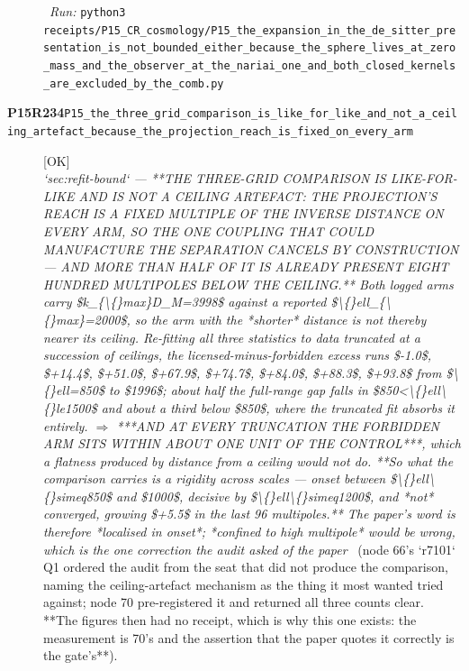 \begin{description}
\ \emph{Run:} \texttt{python3 receipts/P15\_CR\_cosmology/P15\_the\_expansion\_in\_the\_de\_sitter\_presentation\_is\_not\_bounded\_either\_because\_the\_sphere\_lives\_at\_zero\_mass\_and\_the\_observer\_at\_the\_nariai\_one\_and\_both\_closed\_kernels\_are\_excluded\_by\_the\_comb.py}
\item[\rcptlabel{P15_the_three_grid_comparison_is_like_for_like_and_not_a_ceiling_artefact_because_the_projection_reach_is_fixed_on_every_arm}{P15R234}\textbf{P15R234}\quad\texttt{P15\_the\_three\_grid\_comparison\_is\_like\_for\_like\_and\_not\_a\_ceiling\_artefact\_because\_the\_projection\_reach\_is\_fixed\_on\_every\_arm}]\hfill\textsf{[OK]}\\
\textit{`sec:refit-bound` ---  **THE THREE-GRID COMPARISON IS LIKE-FOR-LIKE AND IS NOT A CEILING ARTEFACT: THE PROJECTION'S REACH IS A FIXED MULTIPLE OF THE INVERSE DISTANCE ON EVERY ARM, SO THE ONE COUPLING THAT COULD MANUFACTURE THE SEPARATION CANCELS BY CONSTRUCTION --- AND MORE THAN HALF OF IT IS ALREADY PRESENT EIGHT HUNDRED MULTIPOLES BELOW THE CEILING.** Both logged arms carry \$k\_\{\textbackslash\{\}max\}D\_M=3998\$ against a reported \$\textbackslash\{\}ell\_\{\textbackslash\{\}max\}=2000\$, so the arm with the *shorter* distance is not thereby nearer its ceiling. Re-fitting all three statistics to data truncated at a succession of ceilings, the licensed-minus-forbidden excess runs \$-1.0\$, \$+14.4\$, \$+51.0\$, \$+67.9\$, \$+74.7\$, \$+84.0\$, \$+88.3\$, \$+93.8\$ from \$\textbackslash\{\}ell=850\$ to \$1996\$; about half the full-range gap falls in \$850<\textbackslash\{\}ell\textbackslash\{\}le1500\$ and about a third below \$850\$, where the truncated fit absorbs it entirely. \ensuremath{\Rightarrow} ***AND AT EVERY TRUNCATION THE FORBIDDEN ARM SITS WITHIN ABOUT ONE UNIT OF THE CONTROL***, which a flatness produced by distance from a ceiling would not do. **So what the comparison carries is a rigidity across scales --- onset between \$\textbackslash\{\}ell\textbackslash\{\}simeq850\$ and \$1000\$, decisive by \$\textbackslash\{\}ell\textbackslash\{\}simeq1200\$, and *not* converged, growing \$+5.5\$ in the last 96 multipoles.**  The paper's word is therefore *localised in onset*; *confined to high multipole* would be wrong, which is the one correction the audit asked of the paper} \ (node 66's `r7101` Q1 ordered the audit from the seat that did not produce the comparison, naming the ceiling-artefact mechanism as the thing it most wanted tried against; node 70 pre-registered it and returned all three counts clear. **The figures then had no receipt, which is why this one exists: the measurement is 70's and the assertion that the paper quotes it correctly is the gate's**). 

\end{description}
